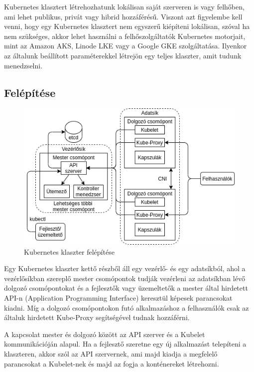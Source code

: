 Kubernetes klasztert létrehozhatunk lokálisan saját szerveren is vagy felhőben,
ami lehet publikus, privát vagy hibrid hozzáférésű. Viszont azt figyelembe 
kell venni, hogy egy Kubernetes klasztert nem egyszerű kiépíteni lokálisan, 
szóval ha nem szükséges, akkor lehet használni a felhőszolgáltatók Kubernetes 
motorjait, mint az Amazon AKS, Linode LKE vagy a Google GKE szolgáltatása.
Ilyenkor az általunk beállított paraméterekkel létrejön egy teljes klaszter, amit
tudunk menedzselni.

\subsection{Felépítése}

\begin{figure}[!ht]
	\centering
	\includegraphics[width=1\textwidth, keepaspectratio]{figures/k8s_architecture.png}
	\caption{Kubernetes klaszter felépítése}
	\label{fig:achitecture}
\end{figure}

Egy Kubernetes klaszter kettő részből áll egy vezérlő- és egy adatsíkból, ahol a 
vezérlősíkban szereplő mester csomópontok tudják vezérleni az adatsíkban 
lévő dolgozó csomópontokat és a fejlesztők vagy üzemeltetők a mester által
hirdetett API-n (Application Programming Interface) keresztül képesek parancsokat
kiadni. Míg a dolgozó csomópontokon futó alkalmazáshoz a felhasználók csak az 
általuk hirdetett Kube-Proxy segítségével tudnak hozzáférni. 

A kapcsolat mester és dolgozó között az API szerver és a Kubelet kommunikációján
alapul. Ha a fejlesztő szeretne egy új alkalmazást telepíteni a klaszteren, akkor
szól az API szervernek, ami majd kiadja a megfelelő parancsokat a Kubelet-nek 
és majd az fogja a konténereket létrehozni.


